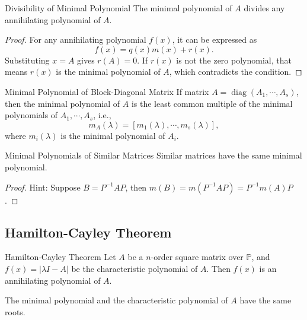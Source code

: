 \begin{proposition}{Divisibility of Minimal Polynomial}{}
  The minimal polynomial of $A$ divides any annihilating polynomial of $A$.
\end{proposition}

\begin{proof}
  For any annihilating polynomial $f(x)$, it can be expressed as
  \begin{equation}
    f(x) = q(x) m(x) + r(x).
  \end{equation}
  Substituting $x = A$ gives $r(A) = 0$.
  If $r(x)$ is not the zero polynomial, that means $r(x)$ is the minimal
  polynomial of $A$, which contradicts the condition.
\end{proof}

\begin{proposition}{Minimal Polynomial of Block-Diagonal Matrix}{}
  If matrix $A = \operatorname{diag}(A_1,\cdots,A_s)$,
  then the minimal polynomial of $A$ is the least common multiple
  of the minimal polynomials of $A_1,\cdots,A_s$, i.e.,
  \begin{equation}
    m_A(\lambda) = [m_1(\lambda),\cdots,m_s(\lambda)],
  \end{equation}
  where $m_i(\lambda)$ is the minimal polynomial of $A_i$.
\end{proposition}

\begin{proposition}{Minimal Polynomials of Similar Matrices}{}
  Similar matrices have the same minimal polynomial.
\end{proposition}

\begin{proof}
  Hint: Suppose $B = P^{-1}AP$,
  then $m(B) = m(P^{-1}AP) = P^{-1}m(A)P$.
\end{proof}

\subsection{Hamilton-Cayley Theorem}

\begin{theorem}{Hamilton-Cayley Theorem}{}
  Let $A$ be a $n$-order square matrix over $\mathbb{P}$,
  and $f(x) = |\lambda I - A|$ be the characteristic polynomial of $A$.
  Then $f(x)$ is an annihilating polynomial of $A$.
\end{theorem}

\begin{corollary}{}{}
  The minimal polynomial and the characteristic polynomial of $A$ have the same roots.
\end{corollary}





